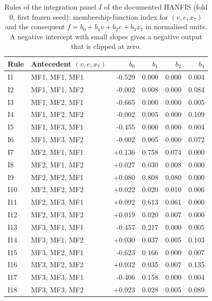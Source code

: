 \documentclass[pdflatex,sn-basic]{sn-jnl}
\theoremstyle{thmstyleone}%
\theoremstyle{thmstyletwo}%
\theoremstyle{thmstylethree}%
\begin{document}
\begin{table}[ht]
\caption{Rules of the integration panel $I$ of the documented HANFIS (fold 0, first frozen seed): membership-function index for $(v,e,x_7)$ and the consequent $f=b_0+b_1v+b_2e+b_3x_7$ in normalised units. A negative intercept with small slopes gives a negative output that is clipped at zero.}
\footnotesize
\begin{tabular}{@{}llrrrr@{}}
\hline
Rule & Antecedent $(v,e,x_7)$ & $b_0$ & $b_1$ & $b_2$ & $b_3$\\
\hline
I1 & MF1, MF1, MF1 & -0.529 & 0.000 & 0.000 & 0.004\\
I2 & MF1, MF1, MF2 & -0.002 & 0.008 & 0.000 & 0.084\\
I3 & MF1, MF2, MF1 & -0.665 & 0.000 & 0.000 & 0.005\\
I4 & MF1, MF2, MF2 & -0.002 & 0.005 & 0.000 & 0.109\\
I5 & MF1, MF3, MF1 & -0.455 & 0.000 & 0.000 & 0.004\\
I6 & MF1, MF3, MF2 & -0.002 & 0.005 & 0.000 & 0.072\\
I7 & MF2, MF1, MF1 & +0.136 & 0.758 & 0.074 & 0.000\\
I8 & MF2, MF1, MF2 & +0.027 & 0.030 & 0.008 & 0.000\\
I9 & MF2, MF2, MF1 & +0.080 & 0.808 & 0.080 & 0.000\\
I10 & MF2, MF2, MF2 & +0.022 & 0.020 & 0.010 & 0.006\\
I11 & MF2, MF3, MF1 & +0.092 & 0.613 & 0.061 & 0.000\\
I12 & MF2, MF3, MF2 & +0.019 & 0.020 & 0.007 & 0.000\\
I13 & MF3, MF1, MF1 & -0.457 & 0.217 & 0.000 & 0.005\\
I14 & MF3, MF1, MF2 & +0.030 & 0.037 & 0.005 & 0.103\\
I15 & MF3, MF2, MF1 & -0.623 & 0.166 & 0.000 & 0.007\\
I16 & MF3, MF2, MF2 & +0.032 & 0.035 & 0.007 & 0.135\\
I17 & MF3, MF3, MF1 & -0.406 & 0.158 & 0.000 & 0.004\\
I18 & MF3, MF3, MF2 & +0.023 & 0.028 & 0.005 & 0.089\\
\hline
\end{tabular}
\end{table}
\end{document}
